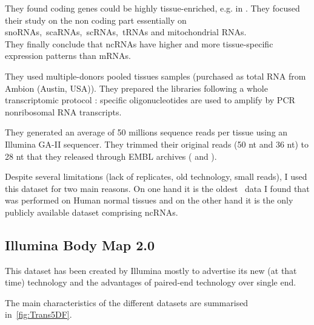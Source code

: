 They found coding genes could be highly tissue-enriched, e.g. 
in . They focused their study on the non coding part essentially
on \glspl{snoRNA},~\glspl{scaRNA},~\glspl{scRNA},~\glspl{tRNA} and mitochondrial
\glspl{RNA}.\\
They finally conclude that \glspl{ncRNA} have higher and more tissue-specific
expression patterns than \glspl{mRNA}.

They used multiple-donors pooled tissues samples (purchased as total \gls{RNA}
from Ambion (Austin, USA)).
They prepared the libraries following a whole transcriptomic protocol \citep{Armour:2009}:
specific oligonucleotides are used to amplify by \gls{PCR} nonribosomal \gls{RNA}
transcripts.

They generated an average of 50 millions sequence reads per tissue
using an Illumina GA-II sequencer. They trimmed their original reads (50 \gls{nt}
and 36 \gls{nt}) to 28 \gls{nt} that they released through EMBL archives (
and ).

Despite several limitations (lack of replicates, old technology, small reads),
I used this dataset for two main reasons. On one hand it is the oldest \Rnaseq\
data I found that was performed on Human normal tissues and on the other hand it
is the only publicly available dataset comprising \glspl{ncRNA}.


\subsection{Illumina Body Map 2.0}

This dataset has been created by Illumina mostly to advertise its new (at that time)
technology and the advantages of paired-end technology over single end.
\citep{illuminaBM}


The main characteristics of the different datasets are summarised
in~\cref{fig:Trans5DF}.

